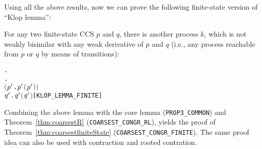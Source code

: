 Using all the above results, now we can prove the following finite-state
version of ``Klop lemma'':
\begin{lemma}
\label{lem:klop-lemma-finite}
For any two finite-state CCS $p$ and $q$, there is another process
$k$, which is not weakly bisimilar 
with any weak derivative  of $p$
and $q$ (i.e., any process reachable from $p$ or $q$ by means of transitions):
\begin{alltt}
\HOLTokenTurnstile{} \HOLSymConst{\HOLTokenForall{}} .
         \HOLSymConst{\HOLTokenConj{}}   \HOLSymConst{\HOLTokenImp{}}
       \HOLSymConst{\HOLTokenExists{}}.
             \HOLSymConst{\HOLTokenConj{}} \ensuremath{(}\HOLSymConst{\HOLTokenForall{}}\ensuremath{\HOLBoundVar{p}\sp{\prime}} .  \HOLTokenWeakTransBegin{}\HOLTokenWeakTransEnd \ensuremath{\HOLBoundVar{p}\sp{\prime}} \HOLSymConst{\HOLTokenImp{}} \HOLSymConst{\HOLTokenNeg{}}\ensuremath{(}\ensuremath{\HOLBoundVar{p}\sp{\prime}} \HOLSymConst{\HOLTokenWeakEQ} \ensuremath{)}\ensuremath{)} \HOLSymConst{\HOLTokenConj{}}
           \HOLSymConst{\HOLTokenForall{}}\ensuremath{\HOLBoundVar{q}\sp{\prime}} .  \HOLTokenWeakTransBegin{}\HOLTokenWeakTransEnd \ensuremath{\HOLBoundVar{q}\sp{\prime}} \HOLSymConst{\HOLTokenImp{}} \HOLSymConst{\HOLTokenNeg{}}\ensuremath{(}\ensuremath{\HOLBoundVar{q}\sp{\prime}} \HOLSymConst{\HOLTokenWeakEQ} \ensuremath{)}\hfill{[KLOP_LEMMA_FINITE]}
\end{alltt}
\end{lemma}
Combining the above lemma with the core lemma
(\texttt{PROP3_COMMON}) and Theorem~\ref{thm:coarsestR} (\texttt{COARSEST_CONGR_RL}),
yields the proof of Theorem~\ref{thm:coarsestfiniteState}
(\texttt{COARSEST_CONGR_FINITE}). The same proof idea can also be used with
 contraction and rooted contration.


